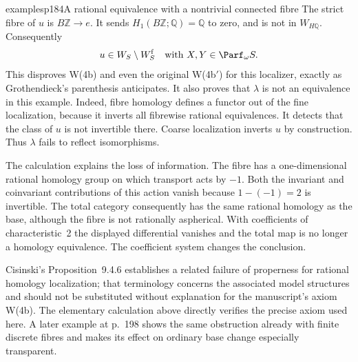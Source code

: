 \begin{dcomment}{examples}{p184}{A rational equivalence with a nontrivial connected fibre}
The strict fibre of $u$ is $B\mathbb Z\to e$. It sends $H_1(B\mathbb Z;\mathbb Q)=\mathbb Q$ to zero, and is not in $W_{H\mathbb Q}$. Consequently
\[
 u\in W_S\setminus W_S^{\mathrm f}
 \quad\text{with }X,Y\in\Parf_\omega S.
\]
This disproves W(4b) and even the original W(4b$'$) for this localizer, exactly as Grothendieck's parenthesis anticipates. It also proves that $\lambda$ is not an equivalence in this example. Indeed, fibre homology defines a functor out of the fine localization, because it inverts all fibrewise rational equivalences. It detects that the class of $u$ is not invertible there. Coarse localization inverts $u$ by construction. Thus $\lambda$ fails to reflect isomorphisms.

The calculation explains the loss of information. The fibre has a one-dimensional rational homology group on which transport acts by $-1$. Both the invariant and coinvariant contributions of this action vanish because $1-(-1)=2$ is invertible. The total category consequently has the same rational homology as the base, although the fibre is not rationally aspherical. With coefficients of characteristic~2 the displayed differential vanishes and the total map is no longer a homology equivalence. The coefficient system changes the conclusion.

Cisinski's Proposition~9.4.6 establishes a related failure of properness for rational homology localization; that terminology concerns the associated model structures and should not be substituted without explanation for the manuscript's axiom W(4b). The elementary calculation above directly verifies the precise axiom used here. A later example at p.~198 shows the same obstruction already with finite discrete fibres and makes its effect on ordinary base change especially transparent.
\end{dcomment}

